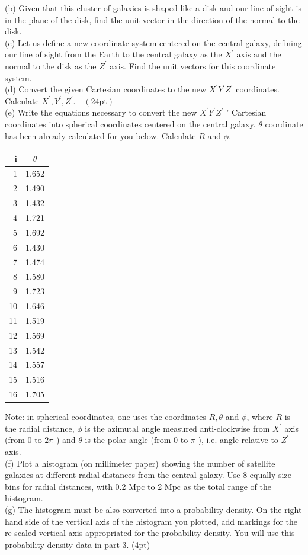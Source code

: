 \documentclass[10pt]{article}
\begin{document}
(b) Given that this cluster of galaxies is shaped like a disk and our line of sight is in the plane of the disk, find the unit vector in the direction of the normal to the disk.\\
(c) Let us define a new coordinate system centered on the central galaxy, defining our line of sight from the Earth to the central galaxy as the $X^{\prime}$ axis and the normal to the disk as the $Z^{\prime}$ axis. Find the unit vectors for this coordinate system.\\
(d) Convert the given Cartesian coordinates to the new $X^{\prime} Y^{\prime} Z^{\prime}$ coordinates. Calculate $X^{\prime}, Y^{\prime}, Z^{\prime} . \quad(24 \mathrm{pt})$\\
(e) Write the equations necessary to convert the new $X^{\prime} Y^{\prime} Z^{\prime}$ ' Cartesian coordinates into spherical coordinates centered on the central galaxy. $\theta$ coordinate has been already calculated for you below. Calculate $R$ and $\phi$.

\begin{center}
\begin{tabular}{|r|c|}
\hline
i & $\theta$ \\
\hline\hline
1 & 1.652 \\
\hline
2 & 1.490 \\
\hline
3 & 1.432 \\
\hline
4 & 1.721 \\
\hline
5 & 1.692 \\
\hline
6 & 1.430 \\
\hline
7 & 1.474 \\
\hline
8 & 1.580 \\
\hline
9 & 1.723 \\
\hline
10 & 1.646 \\
\hline
11 & 1.519 \\
\hline
12 & 1.569 \\
\hline
13 & 1.542 \\
\hline
14 & 1.557 \\
\hline
15 & 1.516 \\
\hline
16 & 1.705 \\
\hline
\end{tabular}
\end{center}

Note: in spherical coordinates, one uses the coordinates $R, \theta$ and $\phi$, where $R$ is the radial distance, $\phi$ is the azimutal angle measured anti-clockwise from $X^{\prime}$ axis (from 0 to $2 \pi$ ) and $\theta$ is the polar angle (from 0 to $\pi$ ), i.e. angle relative to $Z^{\prime}$ axis.\\
(f) Plot a histogram (on millimeter paper) showing the number of satellite galaxies at different radial distances from the central galaxy. Use 8 equally size bins for radial distances, with 0.2 Mpc to 2 Mpc as the total range of the histogram.\\
(g) The histogram must be also converted into a probability density. On the right hand side of the vertical axis of the histogram you plotted, add markings for the re-scaled vertical axis appropriated for the probability density. You will use this probability density data in part 3. (4pt)
\end{document}

